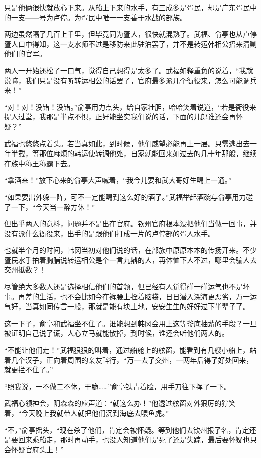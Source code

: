 只是他俩很快就放心下来。从船上下来的水手，有三成多是疍民，却是广东疍民中的一支——号为卢停。为疍民中唯一一支善于水战的部族。

两边虽然隔了几百上千里，但毕竟同为疍人，很快就混熟了。武福、俞亭也从卢停疍人口中得知，这一支水师不过是移防来此驻泊罢了，并不是转运韩相公招来清剿他们的官军。

两人一开始还松了一口气，觉得自己想得是太多了。武福如释重负的说着，“我就说嘛，我们只是没有听转运相公的话罢了，官府最多派几个衙役来，怎么可能调兵来！”

“对！对！没错！没错。”俞亭用力点头，给自家壮胆，哈哈笑着说道，“若是衙役来提人过堂，我那是半点不惧，正好能坐实我们说的话，下面的儿郎谁还会再怀疑？”

武福也悠悠点着头。若当真如此，到时候，他们威望必能再上一层。只需逃出去一年半载，等那位麻烦的韩运使转调他处，自家就能回来如过去的几十年那般，继续在族中称王称霸下去。

“拿酒来！”放下心来的俞亭大声喊着，“我今儿要和武大哥好生喝上一通。”

“如果要出外躲一阵，可不一定能喝到这么好的酒了。”武福举起酒碗与俞亭用力碰了一下，“今天当一醉方休！”

但出乎两人的意料，问题并不是出在官府。钦州官府根本没把他们当做一回事，并没有派什么衙役来，出手的是跟他们打成一片的卢停部的疍人水手。

也就半个月的时间，韩冈当初对他们说的话，在部族中原原本本的传扬开来。不少疍民水手拍着胸脯说转运相公是个一言九鼎的人，再体恤下人不过，哪里会骗人去交州抵数？！

尽管绝大多数人还是选择相信他们的首领，但已经有人觉得碰一碰运气也不是坏事。再差的生活，也不会比如今在裤腰上拴着脑袋，日日潜入深海更恶劣，万一运气好，当真如同传言一般，那就是能有块土地，安安生生的好好过下半辈子了。

这一下子，俞亭和武福坐不住了。谁能想到韩冈会用上这等釜底抽薪的手段？一旦被证明自己说了谎，人心立马就能散掉，到时候，谁还会听他们两人的。

“不能让他们走！”武福狠狠的叫着，通过船舱上的舷窗，能看到有几艘小船上，站着几个汉子，正向着周围的亲友辞行，“万一去了交州，一两年后得了好处回来，就更拦不住了。”

“照我说，一不做二不休，干脆……”俞亭铁青着脸，用手刀往下挥了一下。

武福心领神会，阴森森的应声道：“就这么办！”他透过舷窗对外狠厉的狞笑着，“今天晚上我就带人就把他们沉到海底去喂鱼虎。”

“不，”俞亭摇头，“现在杀了他们，肯定会被怀疑。等到他们去钦州报了名，肯定还是要回来乘船走，那时再动手，也没人知道他们是死了还是失踪，最后要怀疑也只会怀疑官府头上！”


